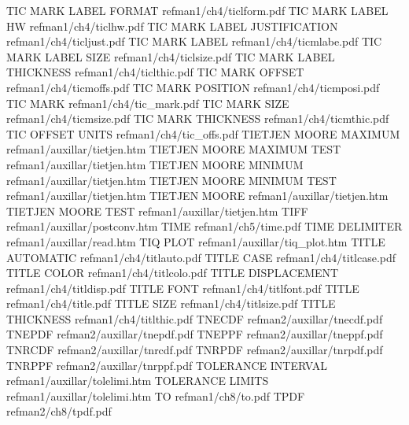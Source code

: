 TIC MARK LABEL FORMAT                   refman1/ch4/ticlform.pdf
TIC MARK LABEL HW                       refman1/ch4/ticlhw.pdf
TIC MARK LABEL JUSTIFICATION            refman1/ch4/ticljust.pdf
TIC MARK LABEL                          refman1/ch4/ticmlabe.pdf
TIC MARK LABEL SIZE                     refman1/ch4/ticlsize.pdf
TIC MARK LABEL THICKNESS                refman1/ch4/ticlthic.pdf
TIC MARK OFFSET                         refman1/ch4/ticmoffs.pdf
TIC MARK POSITION                       refman1/ch4/ticmposi.pdf
TIC MARK                                refman1/ch4/tic_mark.pdf
TIC MARK SIZE                           refman1/ch4/ticmsize.pdf
TIC MARK THICKNESS                      refman1/ch4/ticmthic.pdf
TIC OFFSET UNITS                        refman1/ch4/tic_offs.pdf
TIETJEN MOORE MAXIMUM                   refman1/auxillar/tietjen.htm
TIETJEN MOORE MAXIMUM TEST              refman1/auxillar/tietjen.htm
TIETJEN MOORE MINIMUM                   refman1/auxillar/tietjen.htm
TIETJEN MOORE MINIMUM TEST              refman1/auxillar/tietjen.htm
TIETJEN MOORE                           refman1/auxillar/tietjen.htm
TIETJEN MOORE TEST                      refman1/auxillar/tietjen.htm
TIFF                                    refman1/auxillar/postconv.htm
TIME                                    refman1/ch5/time.pdf
TIME DELIMITER                          refman1/auxillar/read.htm
TIQ PLOT                                refman1/auxillar/tiq_plot.htm
TITLE AUTOMATIC                         refman1/ch4/titlauto.pdf
TITLE CASE                              refman1/ch4/titlcase.pdf
TITLE COLOR                             refman1/ch4/titlcolo.pdf
TITLE DISPLACEMENT                      refman1/ch4/titldisp.pdf
TITLE FONT                              refman1/ch4/titlfont.pdf
TITLE                                   refman1/ch4/title.pdf
TITLE SIZE                              refman1/ch4/titlsize.pdf
TITLE THICKNESS                         refman1/ch4/titlthic.pdf
TNECDF                                  refman2/auxillar/tnecdf.pdf
TNEPDF                                  refman2/auxillar/tnepdf.pdf
TNEPPF                                  refman2/auxillar/tneppf.pdf
TNRCDF                                  refman2/auxillar/tnrcdf.pdf
TNRPDF                                  refman2/auxillar/tnrpdf.pdf
TNRPPF                                  refman2/auxillar/tnrppf.pdf
TOLERANCE INTERVAL                      refman1/auxillar/tolelimi.htm
TOLERANCE LIMITS                        refman1/auxillar/tolelimi.htm
TO                                      refman1/ch8/to.pdf
TPDF                                    refman2/ch8/tpdf.pdf
